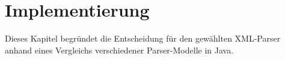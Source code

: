 \chapter{Implementierung}
\label{chap:implementation}


Dieses Kapitel begründet die Entscheidung für den gewählten \gls{XML}-Parser anhand eines Vergleichs verschiedener Parser-Modelle in Java.



